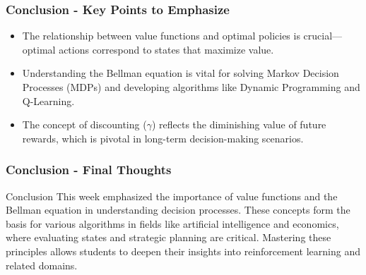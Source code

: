 \documentclass{beamer}
\begin{document}
\begin{frame}[fragile]
    \frametitle{Conclusion - Key Points to Emphasize}
    \begin{itemize}
        \item The relationship between value functions and optimal policies is crucial—optimal actions correspond to states that maximize value.
        \item Understanding the Bellman equation is vital for solving Markov Decision Processes (MDPs) and developing algorithms like Dynamic Programming and Q-Learning.
        \item The concept of discounting ($\gamma$) reflects the diminishing value of future rewards, which is pivotal in long-term decision-making scenarios.
    \end{itemize}
\end{frame}

\begin{frame}[fragile]
    \frametitle{Conclusion - Final Thoughts}
    \begin{block}{Conclusion}
        This week emphasized the importance of value functions and the Bellman equation in understanding decision processes. These concepts form the basis for various algorithms in fields like artificial intelligence and economics, where evaluating states and strategic planning are critical. Mastering these principles allows students to deepen their insights into reinforcement learning and related domains.
    \end{block}
\end{frame}
\end{document}
